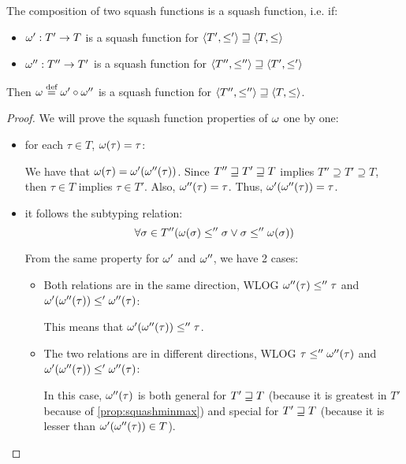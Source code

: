 \documentclass[main.tex]{subfiles}
\begin{document}
\begin{property}\label{prop:squashcomp}
    The composition of two squash functions is a squash function, i.e. if:
    \begin{itemize}
        \item $\omega' : T' \rightarrow T$ is a squash function for
            $\langle T', \leq' \rangle \sqsupseteq \langle T, \leq \rangle$
        \item $\omega'' : T'' \rightarrow T'$ is a squash function for
            $\langle T'', \leq'' \rangle \sqsupseteq \langle T', \leq' \rangle$
    \end{itemize}
    Then $\omega \overset{\text{\scriptsize def}}{=} \omega' \circ \omega''$ is a squash function
    for $\langle T'', \leq'' \rangle \sqsupseteq \langle T, \leq \rangle$.
\end{property}
\begin{proof}
    We will prove the squash function properties of $\omega$ one by one:
    \begin{itemize}
        \item for each $\tau \in T$, $\omega(\tau) = \tau$:

            We have that $\omega(\tau) = \omega'(\omega''(\tau))$.
            Since $T'' \sqsupseteq T' \sqsupseteq T$ implies $T'' \supseteq T' \supseteq T$,
            then $\tau \in T$ implies $\tau \in T'$. Also, $\omega''(\tau) = \tau$.
            Thus, $\omega'(\omega''(\tau)) = \tau$.

        \item it follows the subtyping relation:
            \[ \forall \sigma \in T''
                (\omega(\sigma) \leq'' \sigma \lor \sigma \leq'' \omega(\sigma)) \]

            From the same property for $\omega'$ and $\omega''$, we have 2 cases:
            \begin{itemize}
                \item Both relations are in the same direction,
                    WLOG $\omega''(\tau) \leq'' \tau$ and
                    $\omega'(\omega''(\tau)) \leq' \omega''(\tau)$:


                    This means that $\omega'(\omega''(\tau)) \leq'' \tau$.

                \item The two relations are in different directions,
                    WLOG $\tau \leq'' \omega''(\tau)$ and
                    $\omega'(\omega''(\tau)) \leq' \omega''(\tau)$:

                    In this case, $\omega''(\tau)$ is both general for $T' \sqsupseteq T$ 
                    (because it is greatest in $T'$ because of \cref{prop:squashminmax})
                    and special for $T' \sqsupseteq T$ (because it is lesser than
                    $\omega'(\omega''(\tau)) \in T$).


\end{itemize}
\end{itemize}
\end{proof}
\end{document}
